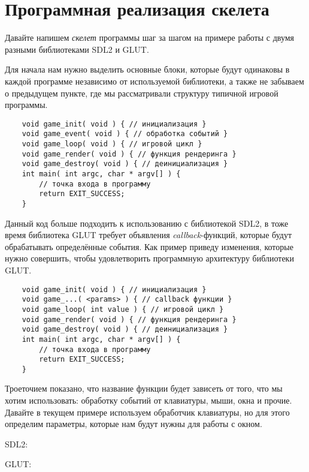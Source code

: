 \pagebreak

\section{Программная реализация скелета}
Давайте напишем \emph{скелет} программы шаг за шагом на примере работы с двумя разными библиотеками SDL2 и 
GLUT.

Для начала нам нужно выделить основные блоки, которые будут одинаковы в каждой программе независимо от 
используемой библиотеки, а также не забываем о предыдущем пункте, где мы рассматривали структуру типичной 
игровой программы.

\begin{lstlisting}
    void game_init( void ) { // инициализация }
    void game_event( void ) { // обработка событий }
    void game_loop( void ) { // игровой цикл }
    void game_render( void ) { // функция рендеринга }
    void game_destroy( void ) { // деинициализация }
    int main( int argc, char * argv[] ) {
        // точка входа в программу
        return EXIT_SUCCESS;
    }
\end{lstlisting}

Данный код больше подходить к использованию с библиотекой SDL2, в тоже время библиотека GLUT требует 
объявления \emph{callback}-функций, которые будут обрабатывать определённые события. Как пример приведу 
изменения, которые нужно совершить, чтобы удовлетворить программную архитектуру библиотеки GLUT.

\begin{lstlisting}
    void game_init( void ) { // инициализация }
    void game_...( <params> ) { // callback функции }
    void game_loop( int value ) { // игровой цикл }
    void game_render( void ) { // функция рендеринга }
    void game_destroy( void ) { // деинициализация }
    int main( int argc, char * argv[] ) {
        // точка входа в программу
        return EXIT_SUCCESS;
    }
\end{lstlisting}

Троеточием показано, что название функции будет зависеть от того, что мы хотим использовать: обработку 
событий от клавиатуры, мыши, окна и прочие. Давайте в текущем примере используем обработчик клавиатуры, но 
для этого определим параметры, которые нам будут нужны для работы с окном.

SDL2:


\pagebreak

GLUT:


